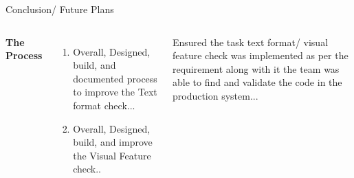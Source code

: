 \documentclass[aspectratio=169,xcolor=dvipsnames]{beamer}
\begin{document}
\begin{frame}{Conclusion/ Future Plans}
    \tableofcontents

    \begin{columns}[c] %

        \textbf{The Process}
        \begin{enumerate}
            \item Overall, Designed, build, and documented process to improve the Text format check...
            \item Overall, Designed, build, and improve the Visual Feature check.. 
        \end{enumerate}

         Ensured the task text format/ visual feature check was implemented as per the requirement along with it the team was able to find and validate the code in the production system...

    \end{columns}   \\

\end{frame}
\end{document}
